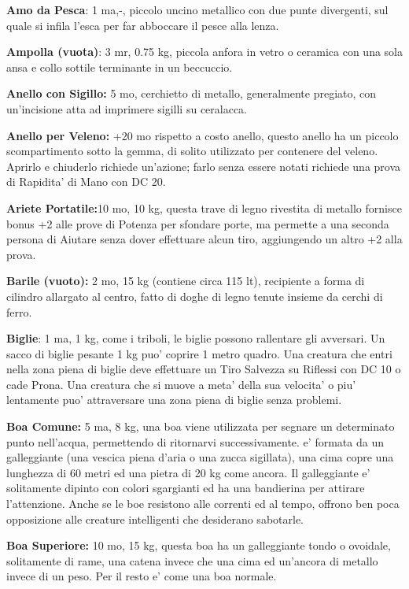 \documentclass[a4paper,11pt,twoside,openany]{dndbook}
\begin{document}
{\textbf{Amo da Pesca}: 1 ma,-, piccolo uncino metallico con due punte divergenti, sul quale si infila l'esca per far abboccare il pesce alla lenza.

\textbf{Ampolla (vuota)}: 3 mr, 0.75 kg, piccola anfora in vetro o ceramica con una sola ansa e collo sottile terminante in un beccuccio.

\textbf{Anello con Sigillo:} 5 mo, cerchietto di metallo, generalmente pregiato, con un'incisione atta ad imprimere sigilli su ceralacca. 

\textbf{Anello per Veleno:} +20 mo rispetto a costo anello, questo anello ha un piccolo scompartimento sotto la gemma, di solito utilizzato per contenere del veleno. Aprirlo e chiuderlo richiede un'azione; farlo senza essere notati richiede una prova di Rapidita' di Mano con DC 20.

\textbf{Ariete Portatile:}10 mo, 10 kg, questa trave di legno rivestita di metallo fornisce bonus +2 alle prove di Potenza per sfondare porte, ma permette a una seconda persona di Aiutare senza dover effettuare alcun tiro, aggiungendo un altro +2 alla prova.

\textbf{Barile (vuoto):} 2 mo, 15 kg (contiene circa 115 lt), recipiente a forma di cilindro allargato al centro, fatto di doghe di legno tenute insieme da cerchi di ferro.

\textbf{Biglie}: 1 ma, 1 kg, come i triboli, le biglie possono rallentare gli avversari. Un sacco di biglie pesante 1 kg puo' coprire 1 metro quadro. Una creatura che entri nella zona piena di biglie deve effettuare un Tiro Salvezza su Riflessi con DC 10 o cade Prona. Una creatura che si muove a meta' della sua velocita' o piu' lentamente puo' attraversare una zona piena di biglie senza problemi.

\textbf{Boa Comune:} 5 ma, 8 kg, una boa viene utilizzata per segnare un determinato punto nell'acqua, permettendo di ritornarvi successivamente. e' formata da un galleggiante (una vescica piena d'aria o una zucca sigillata), una cima copre una lunghezza di 60 metri ed una pietra di 20 kg come ancora. Il galleggiante e' solitamente dipinto con colori sgargianti ed ha una bandierina per attirare l'attenzione. Anche se le boe resistono alle correnti ed al tempo, offrono ben poca opposizione alle creature intelligenti che desiderano sabotarle.

\textbf{Boa Superiore:} 10 mo, 15 kg, questa boa ha un galleggiante tondo o ovoidale, solitamente di rame, una catena invece che una cima ed un'ancora di metallo invece di un peso. Per il resto e' come una boa normale.

}
\end{document}
